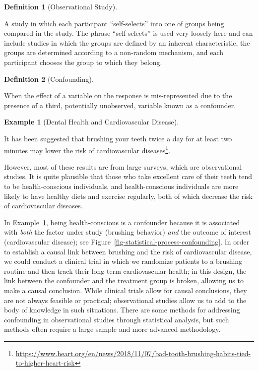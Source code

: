 \documentclass[
  letterpaper,
  DIV=11,
  numbers=noendperiod]{scrreprt}
\theoremstyle{definition}
\newtheorem{definition}{Definition}[chapter]
\theoremstyle{definition}
\newtheorem{example}{Example}[chapter]
\theoremstyle{remark}
\begin{document}
\begin{definition}[Observational
Study]\protect\hypertarget{def-observational-study}{}\label{def-observational-study}

A study in which each participant ``self-selects'' into one of groups
being compared in the study. The phrase ``self-selects'' is used very
loosely here and can include studies in which the groups are defined by
an inherent characteristic, the groups are determined according to a
non-random mechanism, and each participant chooses the group to which
they belong.

\end{definition}

\begin{definition}[Confounding]\protect\hypertarget{def-confounding}{}\label{def-confounding}

When the effect of a variable on the response is mis-represented due to
the presence of a third, potentially unobserved, variable known as a
confounder.

\end{definition}

\begin{example}[Dental Health and Cardiovascular
Disease]\protect\hypertarget{exm-dental-health}{}\label{exm-dental-health}

It has been suggested that brushing your teeth twice a day for at least
two minutes may lower the risk of cardiovascular diseases\footnote{\url{https://www.heart.org/en/news/2018/11/07/bad-tooth-brushing-habits-tied-to-higher-heart-risk}}.

However, most of these results are from large surveys, which are
observational studies. It is quite plausible that those who take
excellent care of their teeth tend to be health-conscious individuals,
and health-conscious individuals are more likely to have healthy diets
and exercise regularly, both of which decrease the risk of
cardiovascular diseases.

\end{example}

In Example~\ref{exm-dental-health}, being health-conscious is a
confounder because it is associated with \emph{both} the factor under
study (brushing behavior) \emph{and} the outcome of interest
(cardiovascular disease); see
Figure~\ref{fig-statistical-process-confounding}. In order to establish
a causal link between brushing and the risk of cardiovascular disease,
we could conduct a clinical trial in which we randomize patients to a
brushing routine and then track their long-term cardiovascular health;
in this design, the link between the confounder and the treatment group
is broken, allowing us to make a causal conclusion. While clinical
trials allow for causal conclusions, they are not always feasible or
practical; observational studies allow us to add to the body of
knowledge in such situations. There are some methods for addressing
confounding in observational studies through statistical analysis, but
such methods often require a large sample and more advanced methodology.
\end{document}
